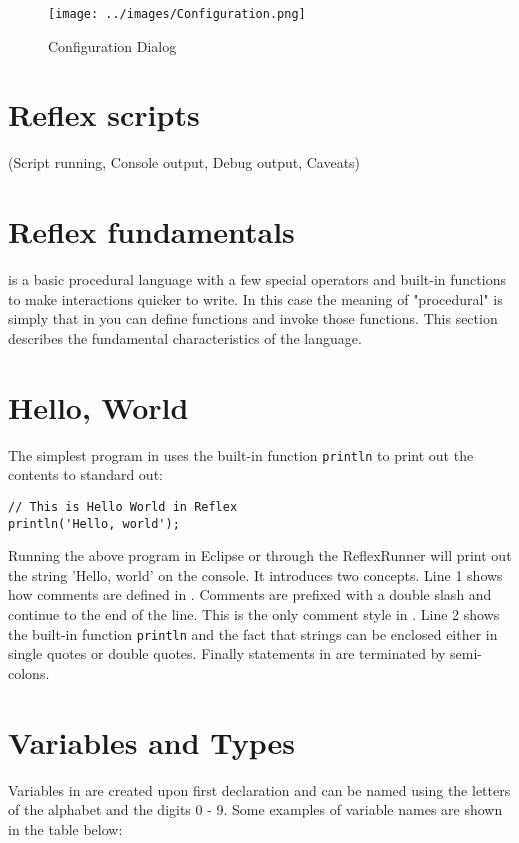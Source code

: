 \begin{figure}[htb]
\centering
\texttt{[image: ../images/Configuration.png]}
\caption{Configuration Dialog}
\label{fig:Configuration}
\end{figure}

\section{Reflex scripts}
(Script running, Console output, Debug output, Caveats)

\section{Reflex fundamentals}
\Reflex is a basic procedural language with a few special operators  and built-in functions  to make \Rapture interactions quicker to write. In this case the meaning of "procedural" is simply that in \Reflex you can define functions and invoke those functions. This section describes the fundamental characteristics of the language.
\section{Hello, World}
The simplest program in \Reflex uses the built-in function \Verb+println+  to print out the contents to standard out:
\begin{lstlisting}[caption={Hello world}]
// This is Hello World in Reflex
println('Hello, world');

\end{lstlisting}

Running the above program in Eclipse or through the ReflexRunner will print out the string 'Hello, world' on the console. It introduces two concepts. Line 1 shows how comments are defined in \Reflex. Comments are prefixed with a double slash and continue to the end of the line. This is the only comment style in \Reflex. Line 2 shows the built-in function \Verb+println+ and the fact that strings can be enclosed either in single quotes or double quotes. Finally statements in \Reflex are terminated by semi-colons.

\section{Variables and Types}

Variables  in \Reflex are created upon first declaration and can be named using the letters of the alphabet and the digits 0 - 9. Some examples of variable names are shown in the table below:

